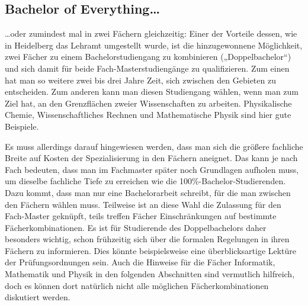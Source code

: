 \subsection{Bachelor of Everything\dots}

\dots oder zumindest mal in zwei Fächern gleichzeitig: Einer der Vorteile dessen, wie in Heidelberg das Lehramt umgestellt wurde, ist die hinzugewonnene Möglichkeit, zwei Fächer zu einem Bachelorstudiengang zu kombinieren („Doppelbachelor“) und sich damit für beide Fach-Mas\-ter\-stu\-di\-en\-gän\-ge zu qualifizieren. Zum einen hat man so weitere zwei bis drei Jahre Zeit, sich zwischen den Gebieten zu entscheiden. Zum anderen kann man diesen Studiengang wählen, wenn man zum Ziel hat, an den Grenzflächen zweier Wissenschaften zu arbeiten. Physikalische Chemie, Wissenschaftliches Rechnen und Mathematische Physik sind hier gute Beispiele.

Es muss allerdings darauf hingewiesen werden, dass man sich die größere fachliche Breite auf Kosten der Spezialisierung in den Fächern aneignet. Das kann je nach Fach bedeuten, dass man im Fachmaster später noch Grundlagen aufholen muss, um dieselbe fachliche Tiefe zu erreichen wie die 100\%-Bachelor-Studierenden. Dazu kommt, dass man nur eine Bachelorarbeit schreibt, für die man zwischen den Fächern wählen muss. Teilweise ist an diese Wahl die Zulassung für den Fach-Master geknüpft, teils treffen Fächer Einschränkungen auf bestimmte Fächerkombinationen. Es ist für Studierende des Doppelbachelors daher besonders wichtig, schon frühzeitig sich über die formalen Regelungen in ihren Fächern zu informieren. Dies könnte beispielsweise eine überblicksartige Lektüre der Prüfungsordnungen sein. Auch die Hinweise für die Fächer Informatik, Mathematik und Physik in den folgenden Abschnitten sind vermutlich hilfreich, doch es können dort natürlich nicht alle möglichen Fächerkombinationen diskutiert werden.


